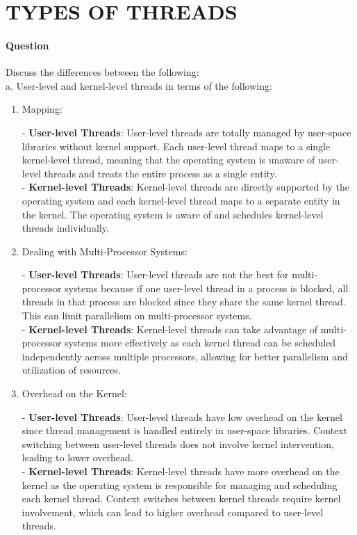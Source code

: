 \documentclass[a4paper,12pt,fleqn]{article}
\newcounter{question}
\newcommand*\question{%
\stepcounter{question}%
\paragraph{Question \thequestion}}
\begin{document}
\section{TYPES OF THREADS}
\question 
{
Discuss the differences between the following: \\
a. User-level and kernel-level threads in terms of the following:
}
\begin{enumerate}

\item{
Mapping:
} 

\begin{answer}
{
- \textbf{User-level Threads}: User-level threads are totally managed by user-space libraries without kernel support.
Each user-level thread maps to a single kernel-level thread, meaning that the operating system is unaware of user-level threads and treats the entire process as a single entity. \\
- \textbf{Kernel-level Threads}: Kernel-level threads are directly supported by the operating system and each kernel-level thread maps to a separate entity in the kernel. The operating system is aware of and schedules kernel-level threads individually.
}
\end{answer}

\item
{
 Dealing with Multi-Processor Systems:
}
\begin{answer}
{
- \textbf{User-level Threads}: User-level threads are not the best for multi-processor systems because if one user-level thread in a process is blocked, all threads in that process are blocked since they share the same kernel thread. This can limit parallelism on multi-processor systems.\\
- \textbf{Kernel-level Threads}: Kernel-level threads can take advantage of multi-processor systems more effectively as each kernel thread can be scheduled independently across multiple processors, allowing for better parallelism and utilization of resources.
}
\end{answer}

\item
{
Overhead on the Kernel:
}
\begin{answer}
{
- \textbf{User-level Threads}: User-level threads have low overhead on the kernel since thread management is handled entirely in user-space libraries. Context switching between user-level threads does not involve kernel intervention, leading to lower overhead.\\
- \textbf{Kernel-level Threads}: Kernel-level threads have more overhead on the kernel as the operating system is responsible for managing and scheduling each kernel thread. Context switches between kernel threads require kernel involvement, which can lead to higher overhead compared to user-level threads.
}
\end{answer}


\end{enumerate}
\end{document}

